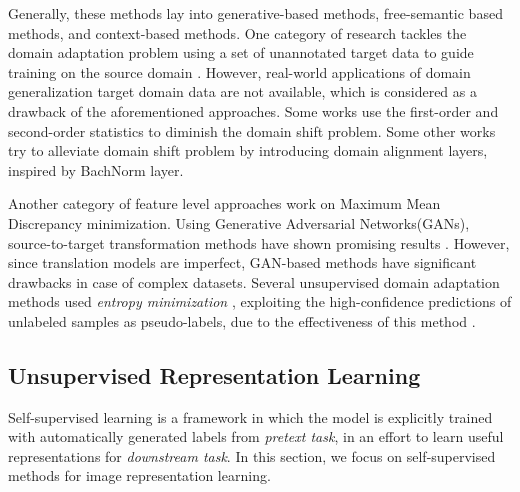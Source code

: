 \documentclass[10pt,twocolumn,letterpaper]{article}
\begin{document}
Generally, these methods lay into generative-based methods\cite{zhang2016colorful, pathak2016context, zhu2017unpaired}, free-semantic based methods\cite{ren2018cross}, and context-based methods\cite{noroozi2016unsupervised, gidaris2018unsupervised, kim2018learning}.
One category of research tackles the domain adaptation problem using a set of unannotated target data to guide training on the source domain \cite{csurka2017domain}. However, real-world applications of domain generalization target domain data are not available, which is considered as a drawback of the aforementioned approaches. Some works use the first-order\cite{long2015learning, venkateswara2017deep} and second-order statistics\cite{sun2016deep, morerio2017minimal} to diminish the domain shift problem.
Some other works try to alleviate domain shift problem by introducing domain alignment layers\cite{mancini2018boosting, cariucci2017autodial}, inspired by BachNorm layer\cite{ioffe2015batch}.

Another category of feature level approaches work on Maximum Mean Discrepancy minimization\cite{long2015learning, sun2016deep, cariucci2017autodial}. Using Generative Adversarial Networks(GANs), source-to-target transformation methods have shown promising results \cite{zhu2017unpaired, kim2017learning, zhu2017unpaired}. However, since translation models are imperfect, GAN-based methods have significant drawbacks in case of complex datasets.
Several unsupervised domain adaptation methods used \textit{entropy minimization} \cite{grandvalet2005semi}, exploiting the high-confidence predictions of unlabeled samples as pseudo-labels, due to the effectiveness of this method \cite{long2017deep, saito2017asymmetric, russo2018source}.

\subsection{Unsupervised Representation Learning}
Self-supervised learning is a framework in which the model is explicitly trained with automatically generated labels from \textit{pretext task}, in an effort to learn useful representations for \textit{downstream task}. In this section, we focus on self-supervised methods for image representation learning.
\end{document}
